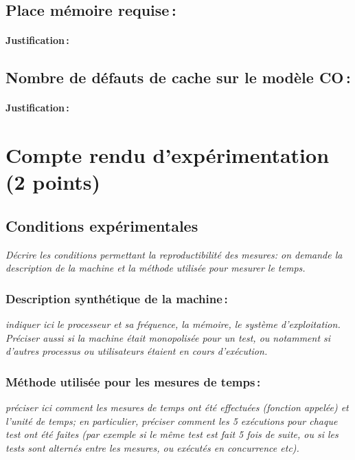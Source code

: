 \documentclass[a4paper, 10pt, french]{article}
\begin{document}
\subsection{Place mémoire requise\,: }
\paragraph{Justification\,: }

\subsection{Nombre de défauts de cache sur le modèle CO\,: }
\paragraph{Justification\,: }


\section{Compte rendu d'expérimentation (2 points)}
\subsection{Conditions expérimentales}
{\em Décrire les conditions permettant la reproductibilité des mesures: on demande la description
  de la machine et la méthode utilisée pour mesurer le temps.
}

\subsubsection{Description synthétique de la machine\,:}
{\em indiquer ici le  processeur et sa fréquence, la mémoire, le système d'exploitation.
  Préciser aussi si la machine était monopolisée pour un test, ou notamment si
  d'autres processus ou utilisateurs étaient en cours d'exécution.
}

\subsubsection{Méthode utilisée pour les mesures de temps\,: }
{\em préciser ici  comment les mesures de temps ont été effectuées (fonction appelée) et l'unité de temps; en particulier,
  préciser comment les 5 exécutions pour chaque test ont été faites (par exemple si le même test est fait 5 fois de suite, ou si les tests sont alternés entre
  les mesures, ou exécutés en concurrence etc).
}
\end{document}

